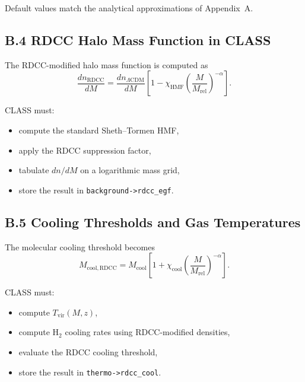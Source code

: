 \documentclass[11pt,a4paper]{article}
\begin{document}
Default values match the analytical approximations of Appendix~A.

\subsection*{B.4 RDCC Halo Mass Function in CLASS}

The RDCC-modified halo mass function is computed as
\begin{equation}
    \frac{dn_{\mathrm{RDCC}}}{dM}
    = \frac{dn_{\Lambda\mathrm{CDM}}}{dM}
      \left[
        1 - \chi_{\mathrm{HMF}}
        \left(\frac{M}{M_{\mathrm{rel}}}\right)^{-\alpha}
      \right].
\end{equation}

CLASS must:

\begin{itemize}
    \item compute the standard Sheth–Tormen HMF,
    \item apply the RDCC suppression factor,
    \item tabulate $dn/dM$ on a logarithmic mass grid,
    \item store the result in \texttt{background->rdcc\_egf}.
\end{itemize}

\subsection*{B.5 Cooling Thresholds and Gas Temperatures}

The molecular cooling threshold becomes
\begin{equation}
    M_{\mathrm{cool,RDCC}}
    = M_{\mathrm{cool}}
      \left[
        1 + \chi_{\mathrm{cool}}
        \left(\frac{M}{M_{\mathrm{rel}}}\right)^{-\alpha}
      \right].
\end{equation}

CLASS must:

\begin{itemize}
    \item compute $T_{\mathrm{vir}}(M,z)$,
    \item compute $\mathrm{H}_2$ cooling rates using RDCC-modified densities,
    \item evaluate the RDCC cooling threshold,
    \item store the result in \texttt{thermo->rdcc\_cool}.
\end{itemize}
\end{document}
